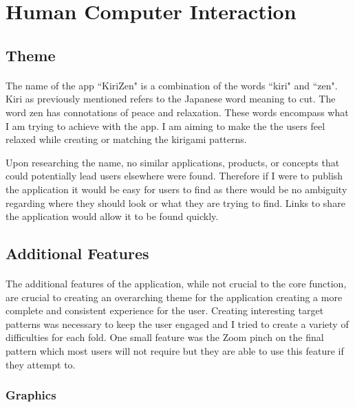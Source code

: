 \documentclass[11pt]{article}
\begin{document}
\clearpage
\newpage
\section{Human Computer Interaction}
    
    \subsection{Theme}
        
        \paragraph{}
        The name of the app ``KiriZen" is a combination of the words ``kiri" and ``zen". Kiri as previously mentioned refers to the Japanese word meaning to cut. The word zen has connotations of peace and relaxation. These words encompass what I am trying to achieve with the app. I am aiming to make the the users feel relaxed while creating or matching the kirigami patterns.
        
        Upon researching the name, no similar applications, products, or concepts that could potentially lead users elsewhere were found. Therefore if I were to publish the application it would be easy for users to find as there would be no ambiguity regarding where they should look or what they are trying to find. Links to share the application would allow it to be found quickly. 

        \subsection{Additional Features}
            \paragraph{}
        The additional features of the application, while not crucial to the core function, are crucial to creating an overarching theme for the application creating a more complete and consistent experience for the user. Creating interesting target patterns was necessary to keep the user engaged and I tried to create a variety of difficulties for each fold. One small feature was the Zoom pinch on the final pattern which most users will not require but they are able to use this feature if they attempt to. 
        
         \subsubsection{Graphics}
\end{document}
